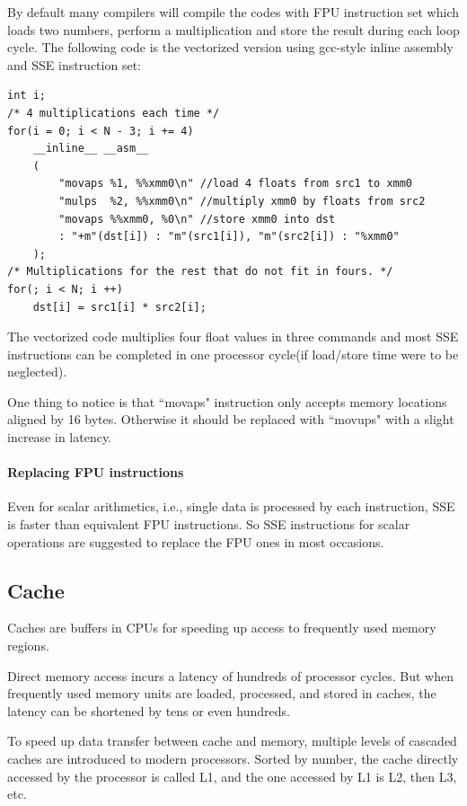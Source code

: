 \documentclass[a4paper]{report}
\begin{document}
	By default many compilers will compile the codes with FPU instruction set which loads two numbers, perform a multiplication and store the result during each loop cycle. The following code is the vectorized version using gcc-style inline assembly and SSE instruction set:
	
        \lstset{language = c, tabsize = 4}
        \begin{lstlisting}
int i;
/* 4 multiplications each time */
for(i = 0; i < N - 3; i += 4)
	__inline__ __asm__
	(
		"movaps %1, %%xmm0\n" //load 4 floats from src1 to xmm0
		"mulps  %2, %%xmm0\n" //multiply xmm0 by floats from src2
		"movaps %%xmm0, %0\n" //store xmm0 into dst
		: "+m"(dst[i]) : "m"(src1[i]), "m"(src2[i]) : "%xmm0"
	);
/* Multiplications for the rest that do not fit in fours. */
for(; i < N; i ++)
	dst[i] = src1[i] * src2[i];
        \end{lstlisting}

	The vectorized code multiplies four float values in three commands and most SSE instructions can be completed in one processor cycle(if load/store time were to be neglected).

	One thing to notice is that ``movaps" instruction only accepts memory locations aligned by 16 bytes. Otherwise it should be replaced with ``movups" with a slight increase in latency.

\paragraph{Replacing FPU instructions} \indent \bigskip

	Even for scalar arithmetics, i.e., single data is processed by each instruction, SSE is faster than equivalent FPU instructions. So SSE instructions for scalar operations are suggested to replace the FPU ones in most occasions.

\subsection{Cache} \indent

	Caches are buffers in CPUs for speeding up access to frequently used memory regions.
	
	Direct memory access incurs a latency of hundreds of processor cycles. But when frequently used memory units are loaded, processed, and stored in caches, the latency can be shortened by tens or even hundreds.
	
	To speed up data transfer between cache and memory, multiple levels of cascaded caches are introduced to modern processors. Sorted by number, the cache directly accessed by the processor is called L1, and the one accessed by L1 is L2, then L3, etc.
	
\end{document}
